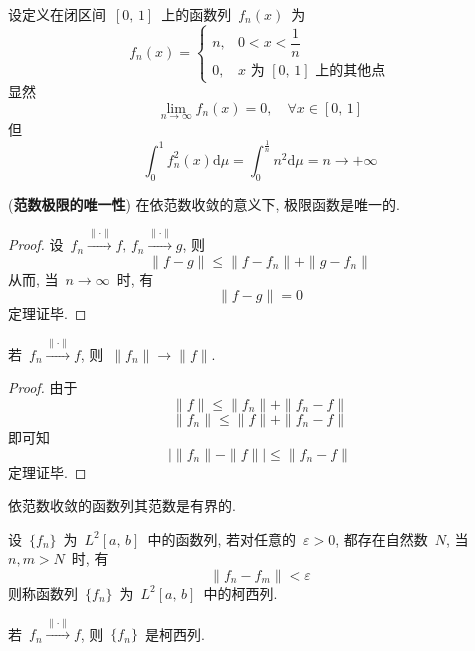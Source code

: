 \begin{Example}
设定义在闭区间~$[0,\,1]$~上的函数列~$f_{n}(x)$~为
\[
f_{n}(x) = \left\{ \!\!
\begin{array}{ll}
n, & 0<x<\dfrac{1}{n}  \\[0.3cm]
0, & x \mbox{~为~} [0,\,1] \mbox{~上的其他点}
\end{array}
\right.
\]
显然
\[
\lim\limits_{n\rightarrow\infty}f_n(x)=0,\quad \forall x\in [0,\,1]
\]
但
\[
\int_{0}^{1}f_{n}^{2}(x)\mathrm{d}\mu=\int_{0}^{\frac{1}{n}}n^{2}\mathrm{d}\mu=n \longrightarrow +\infty
\]

\end{Example}

\begin{Theorem}(\textbf{范数极限的唯一性}) 在依范数收敛的意义下, 极限函数是唯一的.
\end{Theorem}

\begin{proof}
设~$f_{n}\xrightarrow{\mathrm{\|\cdot\|}} f,\, f_{n}\xrightarrow{\mathrm{\|\cdot\|}} g$, 则
\[
\|f-g\|\leqslant \|f-f_{n}\|+\|g-f_{n}\|
\]
从而, 当~$n\rightarrow \infty$~时, 有
\[
\|f-g\|=0
\]
定理证毕.
\end{proof}


\begin{Theorem}
若~$f_{n}\xrightarrow{\mathrm{\|\cdot\|}} f$, 则~$\|f_n\|\rightarrow \|f\|$.
\end{Theorem}

\begin{proof}
由于
\[
\|f\|\leqslant \|f_{n}\|+\|f_{n}-f\|
\]
\[
\|f_n\|\leqslant \|f\|+\|f_{n}-f\|
\]
即可知
\[
\left|\|f_n\|-\|f\|\right|\leqslant \|f_{n}-f\|
\]
定理证毕.
\end{proof}

\begin{Corollary}
依范数收敛的函数列其范数是有界的.
\end{Corollary}

\begin{Definition}\label{Def-6-4}

设~$\{f_n\}$~为~$L^2[a,\,b]$~中的函数列, 若对任意的~$\varepsilon>0$, 都存在自然数~$N$, 当~$n,m>N$~时, 有
\[
\|f_{n}-f_{m}\|<\varepsilon
\]
则称函数列~$\{f_n\}$~为~$L^2[a,\,b]$~中的柯西列.
\end{Definition}


\begin{Theorem}
若~$f_{n}\xrightarrow{\mathrm{\|\cdot\|}} f$, 则~$\{f_n\}$~是柯西列.
\end{Theorem}

